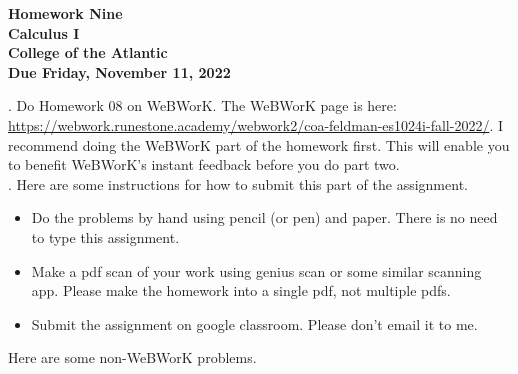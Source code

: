\documentclass[14pt]{extarticle}
\begin{document}
\pagestyle{empty}
 
\begin{center}
{\LARGE {\bf Homework Nine}}\\
\bigskip
{\Large {\bf Calculus I}}\\
\bigskip
{\Large {\bf College of the Atlantic}}\\
\bigskip
{ {\bf Due Friday, November 11, 2022}}\\ 
\end{center}
\medskip


.  Do Homework 08 on
WeBWorK.  The WeBWorK page is here: 
\url{https://webwork.runestone.academy/webwork2/coa-feldman-es1024i-fall-2022/}.
I recommend doing the WeBWorK part of the homework first.  This will
enable you to benefit WeBWorK's instant feedback before you do part
two.\\ 


.  Here are some
instructions for how to submit this part of the assignment.
\begin{itemize}
  \setlength{\itemsep}{0mm}
\item Do the problems by hand using pencil (or pen) and paper.
  There is no need to type this assignment.
\item Make a pdf scan of your work using genius scan or some
  similar scanning app.  Please make the homework into a single
  pdf, not multiple pdfs.
\item Submit the assignment on google classroom.  Please don't
  email it to me.
\end{itemize}

\noindent Here are some non-WeBWorK problems.
\end{document}
